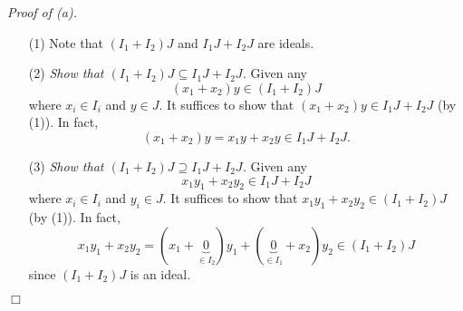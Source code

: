 \documentclass{article}
\begin{document}
\emph{Proof of (a).}
\begin{enumerate}
\item[(1)]
  Note that $(I_1 + I_2) J$ and $I_1 J + I_2 J$ are ideals.

\item[(2)]
  \emph{Show that $(I_1 + I_2) J \subseteq I_1 J + I_2 J$.}
  Given any
  \[
    (x_{1} + x_{2}) y \in (I_1 + I_2) J
  \]
  where $x_{i} \in I_i$ and $y \in J$.
  It suffices to show that $(x_{1} + x_{2}) y \in I_1 J + I_2 J$ (by (1)).
  In fact,
  \[
    (x_{1} + x_{2}) y = x_{1} y + x_{2} y \in I_1 J + I_2 J.
  \]

\item[(3)]
  \emph{Show that $(I_1 + I_2) J \supseteq I_1 J + I_2 J$.}
  Given any
  \[
    x_{1} y_{1} + x_{2} y_{2} \in I_1 J + I_2 J
  \]
  where $x_{i} \in I_i$ and $y_{i} \in J$.
  It suffices to show that $x_{1} y_{1} + x_{2} y_{2} \in (I_1 + I_2) J$ (by (1)).
  In fact,
  \[
    x_{1} y_{1} + x_{2} y_{2}
    = (x_{1}+\underbrace{0}_{\in I_2}) y_{1} + (\underbrace{0}_{\in I_1}+x_{2}) y_{2}
    \in (I_1 + I_2) J
  \]
  since $(I_1 + I_2) J$ is an ideal.
\end{enumerate}
$\Box$ \\
\end{document}

